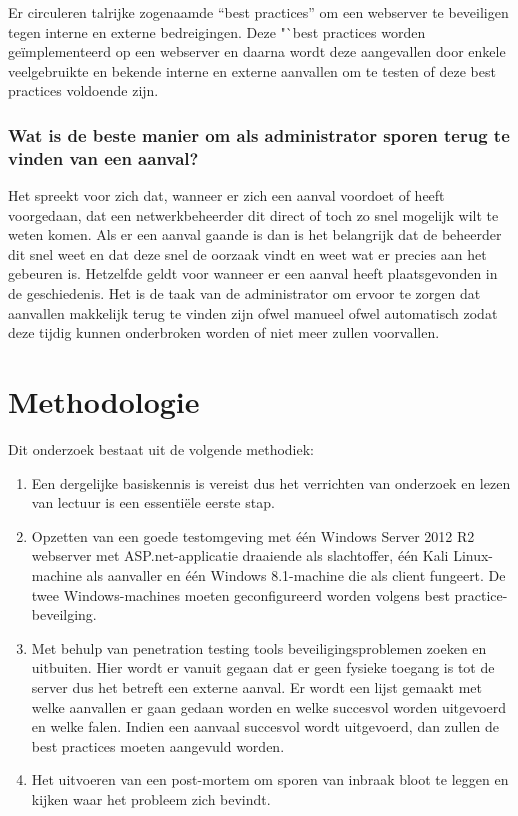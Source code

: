\documentclass[pdftex,a4paper,12pt]{report}
\begin{document}
Er circuleren talrijke zogenaamde "`best practices"' om een webserver te beveiligen tegen interne en externe bedreigingen. Deze "`best practices worden geïmplementeerd op een webserver en daarna wordt deze aangevallen door enkele veelgebruikte en bekende interne en externe aanvallen om te testen of deze best practices voldoende zijn.

\subsection{Wat is de beste manier om als administrator sporen terug te vinden van een aanval?}

Het spreekt voor zich dat, wanneer er zich een aanval voordoet of heeft voorgedaan, dat een netwerkbeheerder dit direct of toch zo snel mogelijk wilt te weten komen. Als er een aanval gaande is dan is het belangrijk dat de beheerder dit snel weet en dat deze snel de oorzaak vindt en weet wat er precies aan het gebeuren is. Hetzelfde geldt voor wanneer er een aanval heeft plaatsgevonden in de geschiedenis. Het is de taak van de administrator om ervoor te zorgen dat aanvallen makkelijk terug te vinden zijn ofwel manueel ofwel automatisch zodat deze tijdig kunnen onderbroken worden of niet meer zullen voorvallen.

\chapter{Methodologie}
\label{ch:methodologie}


Dit onderzoek bestaat uit de volgende methodiek:
\begin{enumerate}
	\item Een dergelijke basiskennis is vereist dus het verrichten van onderzoek en lezen van lectuur is een essentiële eerste stap.
	\item Opzetten van een goede testomgeving met één Windows Server 2012 R2 webserver met ASP.net-applicatie draaiende als slachtoffer, één Kali Linux-machine als aanvaller en één Windows 8.1-machine die als client fungeert. De twee Windows-machines moeten geconfigureerd worden volgens best practice-beveilging.
	\item Met behulp van penetration testing tools beveiligingsproblemen zoeken en uitbuiten. Hier wordt er vanuit gegaan dat er geen fysieke toegang is tot de server dus het betreft een externe aanval. Er wordt een lijst gemaakt met welke aanvallen er gaan gedaan worden en welke succesvol worden uitgevoerd en welke falen. Indien een aanvaal succesvol wordt uitgevoerd, dan zullen de best practices moeten aangevuld worden.
	\item Het uitvoeren van een post-mortem om sporen van inbraak bloot te leggen en kijken waar het probleem zich bevindt.
\end{enumerate}
\end{document}
